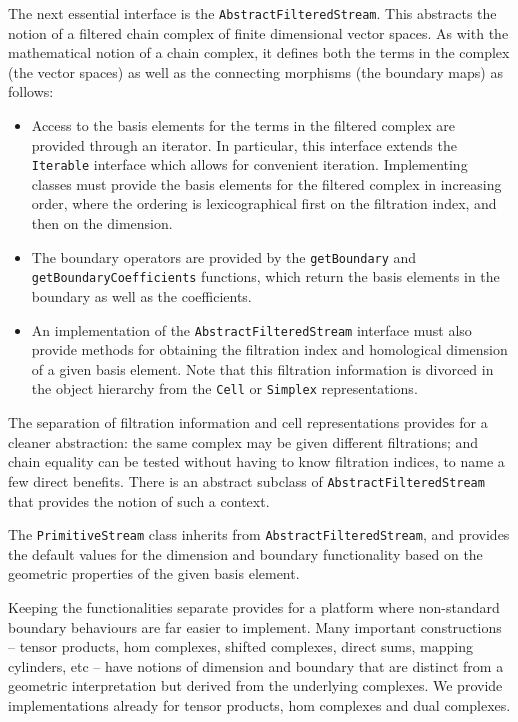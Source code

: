 \documentclass[11pt]{amsart}
\begin{document}
The next essential interface is the  \texttt{Abstract\-Filtered\-Stream}. This abstracts the notion of a filtered chain complex of finite dimensional vector spaces. As with the mathematical notion of a chain complex, it defines both the terms in the complex (the vector spaces) as well as the connecting morphisms (the boundary maps) as follows:

\begin{itemize}
\item Access to the basis elements for the terms in the filtered complex are provided through an iterator. In particular, this interface extends the  \texttt{Iterable} interface which allows for convenient iteration. Implementing classes must provide the basis elements for the filtered complex in increasing order, where the ordering is lexicographical first on the filtration index, and then on the dimension.
\item The boundary operators are provided by the  \texttt{getBoundary} and  \texttt{getBoundaryCoefficients} functions, which return the basis elements in the boundary as well as the coefficients.
\item An implementation of the  \texttt{AbstractFilteredStream} interface must also provide methods for obtaining the filtration index and homological dimension of a given basis element. Note that this filtration information is divorced in the object hierarchy from the \texttt{Cell} or \texttt{Simplex} representations.
\end{itemize}

The separation of filtration information and cell representations provides for a cleaner abstraction: the same complex may be given different filtrations; and chain equality can be tested without having to know filtration indices, to name a few direct benefits. There is an abstract subclass of \texttt{AbstractFilteredStream} that provides the notion of such a context.

The  \texttt{PrimitiveStream} class inherits from  \texttt{AbstractFilteredStream}, and provides the default values for the dimension and boundary functionality based on the geometric properties of the given basis element.

Keeping the functionalities separate provides for a platform where non-standard boundary behaviours are far easier to implement. Many important constructions -- tensor products, hom complexes, shifted complexes, direct sums, mapping cylinders, etc -- have notions of dimension and boundary that are distinct from a geometric interpretation but derived from the underlying complexes. We provide implementations already for tensor products, hom complexes and dual complexes.
\end{document}
